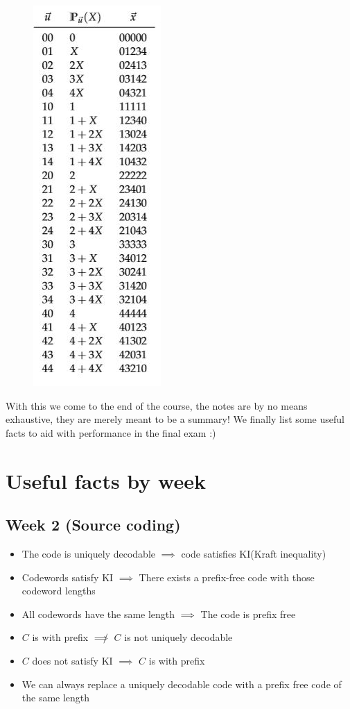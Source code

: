 \documentclass[titlepage]{article}
\begin{document}
\begin{figure}[H]
    \centering
    \includegraphics[scale = 0.6]{src/rsfig.JPG}
    \label{fig:my_label}
\end{figure}

With this we come to the end of the course, the notes are by no means exhaustive, they are merely meant to be a summary! We finally list some useful facts to aid with performance in the final exam :)


\section{Useful facts by week}

\subsection{Week 2 (Source coding)}
\begin{itemize}
    \item The code is uniquely decodable $\implies$ code satisfies KI(Kraft inequality)
    \item Codewords satisfy KI $\implies$ There exists a prefix-free code with those codeword lengths
    \item All codewords have the same length $\implies$ The code is prefix free
    \item $C$ is with prefix $\not \implies$ $C$ is not uniquely decodable
    \item $C$ does not satisfy KI $\implies$ $C$ is with prefix 
    \item We can always replace a uniquely decodable code with a prefix free code of the same length 
\end{itemize}
\end{document}
